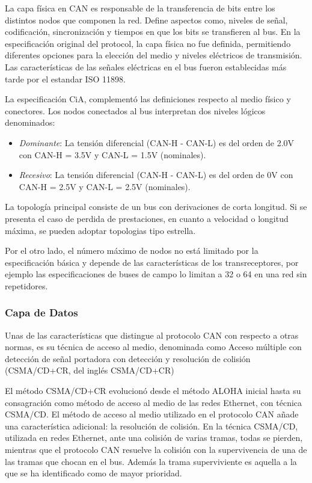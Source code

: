 La capa física en \acrshort{CAN} es responsable de la transferencia de bits 
entre los distintos nodos que componen la red. Define aspectos como, niveles de 
señal, codificación, sincronización y tiempos en que los bits se transfieren al 
bus.
En la especificación original del protocol, la capa física no fue definida, 
permitiendo diferentes opciones para la elección del medio y niveles eléctricos 
de transmisión. Las características de las señales eléctricas en el bus fueron 
establecidas más tarde por el estandar ISO 11898.

La especificación \acrfull{CiA}, complementó las definiciones respecto al medio 
físico y conectores. Los nodos conectados al bus interpretan dos niveles lógicos 
denominados:

\begin{itemize}
    \item \emph{Dominante}: La tensión diferencial (CAN-H - CAN-L) es del orden 
        de 2.0V con CAN-H = 3.5V y CAN-L = 1.5V (nominales).
    \item \emph{Recesivo}: La tensión diferencial (CAN-H - CAN-L) es del orden 
        de 0V con CAN-H = 2.5V y CAN-L = 2.5V (nominales).
\end{itemize}

La topología principal consiste de un bus con derivaciones de corta longitud. 
Si se presenta el caso de perdida de prestaciones, en cuanto a velocidad o
longitud máxima, se pueden adoptar topologias tipo estrella. 

Por el otro lado, el número máximo de nodos no está limitado por la 
especificación básica y depende de las características de los transreceptores,
por ejemplo las especificaciones de buses de campo lo limitan a 32 o 64 en una 
red sin repetidores.

\subsubsection{Capa de Datos}

Unas de las características que distingue al protocolo \acrshort{CAN} con 
respecto a otras normas, es su técnica de acceso al medio, denominada como 
Acceso m\'ultiple con detecci\'on de señal portadora con detecci\'on y
resoluci\'on de colisi\'on (\acrshort{CSMA/CD+CR}, del ingl\'es
\acrlong{CSMA/CD+CR})

El m\'etodo \acrshort{CSMA/CD+CR} evolucion\'o desde el método ALOHA 
inicial hasta su consagración como método de acceso al medio de las redes 
Ethernet, con técnica CSMA/CD. El método de acceso al medio utilizado en el
protocolo \acrshort{CAN} añade una característica adicional: la resolución de 
colisión. En la técnica CSMA/CD, utilizada en redes Ethernet, ante una colisión 
de varias tramas, todas se pierden, mientras que el protocolo \acrshort{CAN} 
resuelve la colisión con la supervivencia de una de las tramas que chocan en el 
bus. Además la trama superviviente es aquella a la que se ha identificado como 
de mayor prioridad. 

